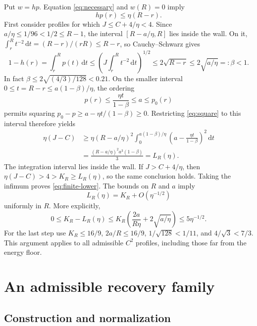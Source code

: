 \documentclass[11pt,a4paper]{article}
\newcommand{\dd}{\,\mathrm d}
\numberwithin{equation}{section}
\begin{document}
Put \(w=hp\). Equation \eqref{eq:necessary} and \(w(R)=0\) imply
\begin{equation}\label{eq:outer-cap}
 hp(r)\le\eta(R-r).
\end{equation}
First consider profiles for which \(J\le C+4/\eta<4\).
Since \(a/\eta\le1/96<1/2\le R-1\), the interval
\([R-a/\eta,R]\) lies inside the wall. On it,
\(\int_r^R t^{-2}\dd t=(R-r)/(rR)\le R-r\), so Cauchy--Schwarz gives
\[
 1-h(r)=\int_r^R p(t)\dd t
 \le\left(J\int_r^R t^{-2}\dd t\right)^{1/2}
 \le2\sqrt{R-r}\le2\sqrt{a/\eta}=:\beta<1 .
\]
In fact \(\beta\le2\sqrt{(4/3)/128}<0.21\). On the smaller interval
\(0\le t=R-r\le a(1-\beta)/\eta\), the ordering
\[
 p(r)\le\frac{\eta t}{1-\beta}\le a\le p_0(r)
\]
permits squaring \(p_0-p\ge a-\eta t/(1-\beta)\ge0\).
Restricting \eqref{eq:square} to this interval therefore yields
\[
 \begin{split}
 \eta(J-C)
 &\ge \eta(R-a/\eta)^2
       \int_0^{a(1-\beta)/\eta}
          \left(a-\frac{\eta t}{1-\beta}\right)^2\dd t\\
 &=\frac{(R-a/\eta)^2a^3(1-\beta)}{3}=L_R(\eta).
 \end{split}
\]
The integration interval lies inside the wall. If \(J>C+4/\eta\),
then \(\eta(J-C)>4>K_R\ge L_R(\eta)\), so the same conclusion holds.
Taking the infimum proves \eqref{eq:finite-lower}. The bounds on
\(R\) and \(a\) imply
\begin{equation}\label{eq:lower-asymptotic}
 L_R(\eta)=K_R+O(\eta^{-1/2})
\end{equation}
uniformly in \(R\). More explicitly,
\[
 0\le K_R-L_R(\eta)
 \le K_R\left(\frac{2a}{R\eta}+2\sqrt{a/\eta}\right)
 \le5\eta^{-1/2}.
\]
For the last step use \(K_R\le16/9\), \(2a/R\le16/9\),
\(1/\sqrt{128}<1/11\), and \(4/\sqrt3<7/3\).
This argument applies to all admissible \(C^2\)
profiles, including those far from the energy floor.

\section{An admissible recovery family}\label{sec:recovery}

\subsection{Construction and normalization}
\end{document}
